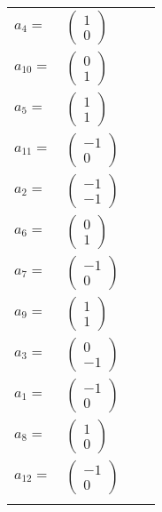 \documentclass[1p]{elsarticle_modified}
\theoremstyle{definition}
\begin{document}
\begin{tabular}{m{7pt} m{180pt} m{7pt} m{180pt} }
\flushright $a_{4}=$&$\begin{pmatrix}1\\0\end{pmatrix}$ \\
\flushright $a_{10}=$&$\begin{pmatrix}0\\1\end{pmatrix}$ \\
\flushright $a_{5}=$&$\begin{pmatrix}1\\1\end{pmatrix}$ \\
\flushright $a_{11}=$&$\begin{pmatrix}-1\\0\end{pmatrix}$ \\
\flushright $a_{2}=$&$\begin{pmatrix}-1\\-1\end{pmatrix}$ \\
\flushright $a_{6}=$&$\begin{pmatrix}0\\1\end{pmatrix}$ \\
\flushright $a_{7}=$&$\begin{pmatrix}-1\\0\end{pmatrix}$ \\
\flushright $a_{9}=$&$\begin{pmatrix}1\\1\end{pmatrix}$ \\
\flushright $a_{3}=$&$\begin{pmatrix}0\\-1\end{pmatrix}$ \\
\flushright $a_{1}=$&$\begin{pmatrix}-1\\0\end{pmatrix}$ \\
\flushright $a_{8}=$&$\begin{pmatrix}1\\0\end{pmatrix}$ \\
\flushright $a_{12}=$&$\begin{pmatrix}-1\\0\end{pmatrix}$\\&\end{tabular}
\end{document}
